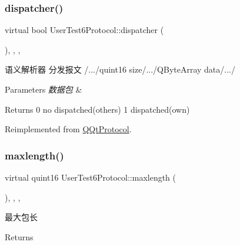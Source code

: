 \subsubsection{\texorpdfstring{dispatcher()}{dispatcher()}}
{\footnotesize\ttfamily virtual bool User\+Test6\+Protocol\+::dispatcher (\begin{DoxyParamCaption}\item[{const Q\+Byte\+Array \&}]{ }\end{DoxyParamCaption})\hspace{0.3cm}{\ttfamily [inline]}, {\ttfamily [override]}, {\ttfamily [protected]}, {\ttfamily [virtual]}}



语义解析器 分发报文 /.../quint16 size/.../\+Q\+Byte\+Array data/.../ 


\begin{DoxyParams}{Parameters}
{\em 数据包} & \\
\hline
\end{DoxyParams}
\begin{DoxyReturn}{Returns}
0 no dispatched(others) 1 dispatched(own) 
\end{DoxyReturn}


Reimplemented from \mbox{\hyperlink{class_q_qt_protocol_a35a69c4b89c8cf7459038f40d75e0dc9}{Q\+Qt\+Protocol}}.

\mbox{\label{class_user_test6_protocol_a1e28f9e5f3b346b890574ecb179629e7}} 
\subsubsection{\texorpdfstring{maxlength()}{maxlength()}}
{\footnotesize\ttfamily virtual quint16 User\+Test6\+Protocol\+::maxlength (\begin{DoxyParamCaption}{ }\end{DoxyParamCaption})\hspace{0.3cm}{\ttfamily [inline]}, {\ttfamily [override]}, {\ttfamily [protected]}, {\ttfamily [virtual]}}



最大包长 

\begin{DoxyReturn}{Returns}

\end{DoxyReturn}


